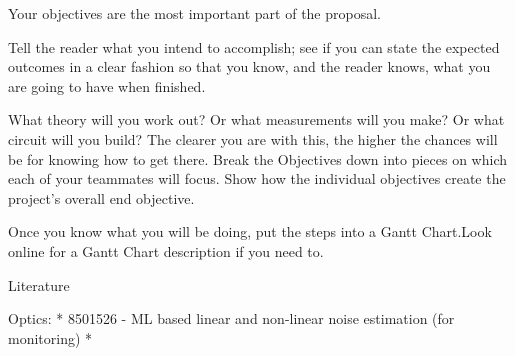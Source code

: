 
\iffalse
Your objectives are the most important part of the proposal. 

Tell the reader what you intend to accomplish; 
	see if you can state the expected outcomes in a clear fashion so that you know, 
	and the reader knows, what you are going to have when finished.
	
What theory will you work out? 
Or what measurements will you make? 
Or what circuit will you build? 
The clearer you are with this, the higher the chances will be for knowing how to get there.
Break the Objectives down into pieces on which each of your teammates will focus. 
Show how the individual objectives create the project’s overall end objective.

Once you know what you will be doing, put the steps into a Gantt Chart.Look online for a Gantt Chart description if you need to.

Literature

Optics:
* 8501526 - ML based linear and non-linear noise estimation (for monitoring)
* 

